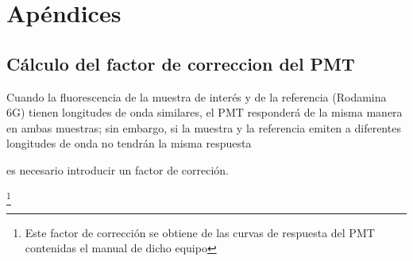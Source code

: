 \chapter{Ap\'endices}

\section{C\'alculo del factor de correccion del PMT}\label{apendicitis} 
 Cuando la fluorescencia de la muestra de inter\'es y de la referencia (Rodamina 6G) tienen longitudes de onda similares, el PMT responder\'a de la misma manera en ambas muestras; sin embargo, si la muestra y la referencia emiten a diferentes longitudes de onda no tendr\'an la misma respuesta 







 es necesario introducir un factor de correci\'on.


\footnote{Este factor de correcci\'on se obtiene de las curvas de respuesta del PMT contenidas el manual de dicho equipo} 







\clearpage
\thispagestyle{empty}
